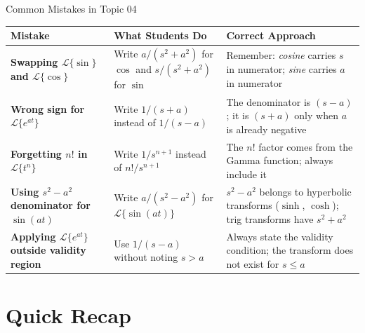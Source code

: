 \documentclass[12pt,a4paper]{article}
\begin{document}
\begin{mistakebox}{Common Mistakes in Topic 04}
\begin{tabular}{@{}>{\bfseries}p{4.5cm}p{4.8cm}p{5cm}@{}}
\toprule
\textbf{Mistake} & \textbf{What Students Do} & \textbf{Correct Approach} \\
\midrule
Swapping $\mathcal{L}\{\sin\}$ and $\mathcal{L}\{\cos\}$ &
Write $a/(s^2+a^2)$ for $\cos$ and $s/(s^2+a^2)$ for $\sin$ &
Remember: \emph{cosine} carries $s$ in numerator; \emph{sine} carries $a$ in numerator \\[6pt]
Wrong sign for $\mathcal{L}\{e^{at}\}$ &
Write $1/(s+a)$ instead of $1/(s-a)$ &
The denominator is $(s - a)$; it is $(s+a)$ only when $a$ is already negative \\[6pt]
Forgetting $n!$ in $\mathcal{L}\{t^n\}$ &
Write $1/s^{n+1}$ instead of $n!/s^{n+1}$ &
The $n!$ factor comes from the Gamma function; always include it \\[6pt]
Using $s^2 - a^2$ denominator for $\sin(at)$ &
Write $a/(s^2 - a^2)$ for $\mathcal{L}\{\sin(at)\}$ &
$s^2 - a^2$ belongs to hyperbolic transforms ($\sinh$, $\cosh$); trig transforms have $s^2 + a^2$ \\[6pt]
Applying $\mathcal{L}\{e^{at}\}$ outside validity region &
Use $1/(s-a)$ without noting $s > a$ &
Always state the validity condition; the transform does not exist for $s \leq a$ \\
\bottomrule
\end{tabular}
\end{mistakebox}

\section{Quick Recap}
\end{document}
